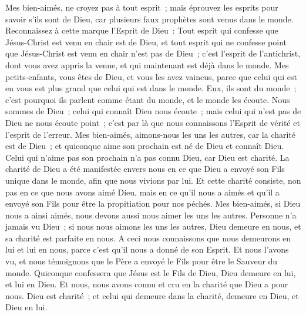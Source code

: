 \begin{multicols}{2}
\VerseOne{}Mes bien-aimés, ne croyez pas à tout esprit~; mais éprouvez les esprits pour savoir s'ils sont de Dieu, car plusieurs faux prophètes sont venus dans le monde.
Reconnaissez à cette marque l'Esprit de Dieu~: Tout esprit qui confesse que Jésus-Christ est venu en chair est de Dieu,
et tout esprit qui ne confesse point que Jésus-Christ est venu en chair n'est pas de Dieu~; c'est l'esprit de l'antichrist, dont vous avez appris la venue, et qui maintenant est déjà dans le monde.
Mes petits-enfants, vous êtes de Dieu, et vous les avez vaincus, parce que celui qui est en vous est plus grand que celui qui est dans le monde.
Eux, ils sont du monde~; c'est pourquoi ils parlent comme étant du monde, et le monde les écoute.
Nous sommes de Dieu~; celui qui connaît Dieu nous écoute~; mais celui qui n'est pas de Dieu ne nous écoute point~; c'est par là que nous connaissons l'Esprit de vérité et l'esprit de l'erreur.
Mes bien-aimés, aimons-nous les uns les autres, car la charité est de Dieu~; et quiconque aime son prochain est né de Dieu et connaît Dieu.
Celui qui n'aime pas son prochain n'a pas connu Dieu, car Dieu est charité.
La charité de Dieu a été manifestée envers nous en ce que Dieu a envoyé son Fils unique dans le monde, afin que nous vivions par lui.
Et cette charité consiste, non pas en ce que nous avons aimé Dieu, mais en ce qu'il nous a aimés et qu'il a envoyé son Fils pour être la propitiation pour nos péchés.
Mes bien-aimés, si Dieu nous a ainsi aimés, nous devons aussi nous aimer les uns les autres.
Personne n'a jamais vu Dieu~; si nous nous aimons les uns les autres, Dieu demeure en nous, et sa charité est parfaite en nous.
A ceci nous connaissons que nous demeurons en lui et lui en nous, parce c'est qu'il nous a donné de son Esprit.
Et nous l'avons vu, et nous témoignons que le Père a envoyé le Fils pour être le Sauveur du monde.
Quiconque confessera que Jésus est le Fils de Dieu, Dieu demeure en lui, et lui en Dieu.
Et nous, nous avons connu et cru en la charité que Dieu a pour nous. Dieu est charité~; et celui qui demeure dans la charité, demeure en Dieu, et Dieu en lui.

\end{multicols}
